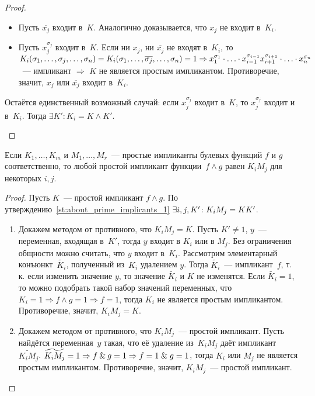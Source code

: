 \begin{proof}
\begin{itemize}
\begin{itemize}
		\item Пусть $\overline{x_j}$ входит в~$K$.
		Аналогично доказывается, что $x_j$ не входит в~$K_i$.
		
		\item Пусть $x_j^{\sigma_j}$ входит в~$K$.
		Если ни $x_j$, ни $\overline{x_j}$ не входят в~$K_i$, то $K_i(\sigma_1, \ldots, \sigma_j, \ldots, \sigma_n) \opbr=
		K_i(\sigma_1, \ldots, \overline{\sigma_j}, \ldots, \sigma_n) = 1 \Rightarrow
		x_1^{\sigma_1} \cdot \ldots \cdot x_{i-1}^{\sigma_{i-1}} x_{i+1}^{\sigma_{i+1}} \cdot \ldots \cdot x_n^{\sigma_n}$~--- импликант $\Rightarrow$ $K$ не является простым импликантом.
		Противоречие, значит, $x_j$ или $\overline{x_j}$ входит в~$K_i$.
	\end{itemize}
	
	Остаётся единственный возможный случай: если $x_j^{\sigma_j}$ входит в~$K$, то $x_j^{\sigma_j}$ входит и в~$K_i$.
	Тогда $\exists K' \colon K_i = K \land K'$.
\end{itemize}
\end{proof}

\begin{statement}
\label{st:prime_implicants_of_conjuction}
Если $K_1, \ldots, K_m$ и $M_1, \ldots, M_r$~--- простые импликанты булевых функций $f$ и $g$ соответственно, то любой простой импликант функции~$f \land g$ равен $K_i M_j$ для некоторых $i, j$.
\end{statement}
\begin{proof}
Пусть $K$~--- простой импликант $f \land g$.
По утверждению~\ref*{st:about_prime_implicants_1} $\exists i, j, K' \colon K_i M_j \opbr= K K'$.
\begin{enumerate}
	\item Докажем методом от противного, что $K_i M_j = K$.
	Пусть $K' \neq 1$, $y$~--- переменная, входящая в~$K'$, тогда $y$ входит в $K_i$ или в $M_j$.
	Без ограничения общности можно считать, что $y$ входит в~$K_i$.
	Рассмотрим элементарный конъюнкт~$\widetilde{K_i}$, полученный из~$K_i$ удалением $y$.
	Тогда $\widetilde{K_i}$~--- импликант~$f$, т.\,к. если изменить значение $y$, то значение $\widetilde{K_i}$ и $K$ не изменятся.
	Если $\widetilde{K_i} = 1$, то можно подобрать такой набор значений переменных, что $K_i = 1 \Rightarrow f \land g = 1 \Rightarrow f = 1$, тогда $K_i$ не является простым импликантом.
	Противоречие, значит, $K_i M_j = K$.
	
	\item Докажем методом от противного, что $K_i M_j$~--- простой импликант.
	Пусть найдётся переменная~$y$ такая, что её удаление из~$K_i M_j$ даёт импликант~$\widetilde{K_i M_j}$.
	$\widetilde{K_i M_j} = 1 \Rightarrow f \mathbin{\&} g = 1 \Rightarrow f = 1 \mathrel{\&} g = 1$, тогда $K_i$ или $M_j$ не является простым импликантом.
	Противоречие, значит, $K_i M_j$~--- простой импликант.
\end{enumerate}
\end{proof}

